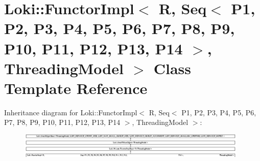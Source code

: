 \hypertarget{classLoki_1_1FunctorImpl_3_01R_00_01_01_01_01_01_01_01_01_01_01_01_01_01_01_01_01_01_01_01_01_01d61e3ebe027f187786ba8179102cc4e2}{}\section{Loki\+:\+:Functor\+Impl$<$ R, Seq$<$ P1, P2, P3, P4, P5, P6, P7, P8, P9, P10, P11, P12, P13, P14 $>$, Threading\+Model $>$ Class Template Reference}
\label{classLoki_1_1FunctorImpl_3_01R_00_01_01_01_01_01_01_01_01_01_01_01_01_01_01_01_01_01_01_01_01_01d61e3ebe027f187786ba8179102cc4e2}
Inheritance diagram for Loki\+:\+:Functor\+Impl$<$ R, Seq$<$ P1, P2, P3, P4, P5, P6, P7, P8, P9, P10, P11, P12, P13, P14 $>$, Threading\+Model $>$\+:\begin{figure}[H]
\begin{center}
\leavevmode
\includegraphics[height=1.158221cm]{classLoki_1_1FunctorImpl_3_01R_00_01_01_01_01_01_01_01_01_01_01_01_01_01_01_01_01_01_01_01_01_01d61e3ebe027f187786ba8179102cc4e2}
\end{center}
\end{figure}
